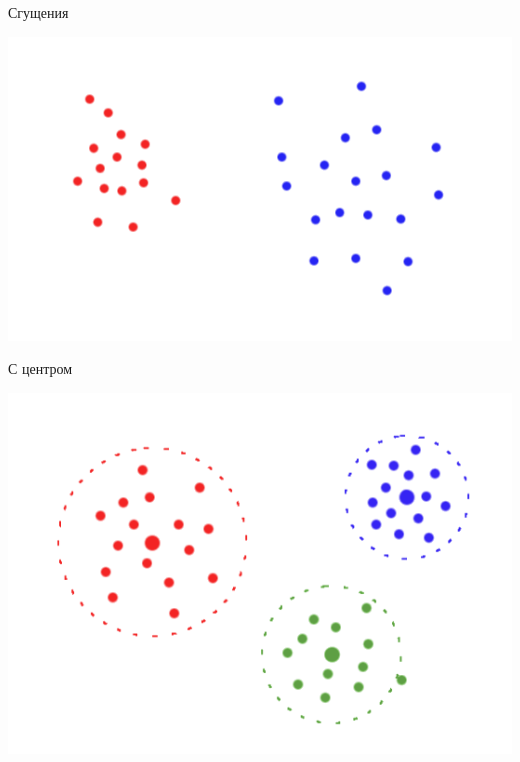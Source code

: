 \documentclass[10pt]{beamer}
\begin{document}
\begin{frame}{Сгущения}
	\begin{center}
    \includegraphics[height=0.6 \textheight, keepaspectratio = true]{images/cluster1}  
	\end{center}
\end{frame}

\begin{frame}{С центром}
	\begin{center}
	  \includegraphics[height=0.6 \textheight, keepaspectratio = true]{images/cluster3}  
	\end{center}
\end{frame}
\end{document}
